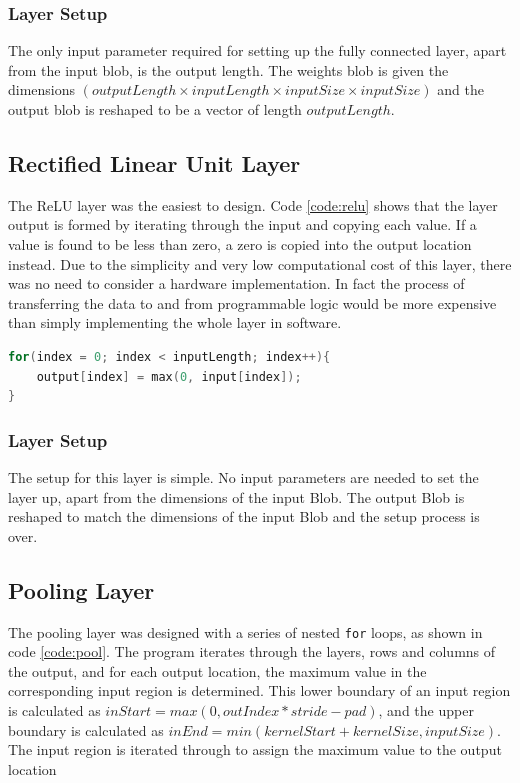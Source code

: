 \documentclass[12pt]{article}
\begin{document}
\subsubsection{Layer Setup}
\label{sec:Design-FC-Setup}

The only input parameter required for setting up the fully connected layer, apart from the input blob, is the output length. The weights blob is given the dimensions $(outputLength \times inputLength \times inputSize \times inputSize)$ and the output blob is reshaped to be a vector of length $outputLength$. 

\subsection{Rectified Linear Unit Layer}
\label{sec:Design-Relu}

The ReLU layer was the easiest to design. Code \ref{code:relu} shows that the layer output is formed by iterating through the input and copying each value. If a value is found to be less than zero, a zero is copied into the output location instead. Due to the simplicity and very low computational cost of this layer, there was no need to consider a hardware implementation. In fact the process of transferring the data to and from programmable logic would be more expensive than simply implementing the whole layer in software. 

\renewcommand{\lstlistingname}{Code}
\begin{lstlisting}[caption=ReLU layer computation, label=code:relu, language=C, float=ht]
for(index = 0; index < inputLength; index++){
	output[index] = max(0, input[index]);
}
\end{lstlisting} 

\subsubsection{Layer Setup}
\label{sec:Design-Relu-Setup}

The setup for this layer is simple. No input parameters are needed to set the layer up, apart from the dimensions of the input Blob. The output Blob is reshaped to match the dimensions of the input Blob and the setup process is over.

\subsection{Pooling Layer}
\label{sec:Design-Pool}

The pooling layer was designed with a series of nested \lstinline|for| loops, as shown in code \ref{code:pool}. The program iterates through the layers, rows and columns of the output, and for each output location, the maximum value in the corresponding input region is determined. This lower boundary of an input region is calculated as $inStart = max(0, outIndex * stride - pad)$, and the upper boundary is calculated as $inEnd = min(kernelStart + kernelSize, inputSize)$. The input region is iterated through to assign the maximum value to the output location
\end{document}

